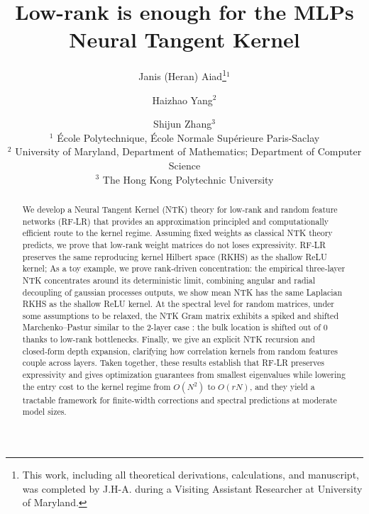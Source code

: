\documentclass{article}
\title{Low-rank is enough for the MLPs Neural Tangent Kernel}
\author{
  Janis (Heran) Aiad\thanks{This work, including all theoretical derivations, calculations, and manuscript, was completed by J.H-A. during a Visiting Assistant Researcher at University of Maryland.}$^{1}$ \and Haizhao Yang$^{2}$ \and Shijun Zhang$^{3}$ \\
  $^{1}$ École Polytechnique, École Normale Supérieure Paris-Saclay  \\
  $^{2}$ University of Maryland, Department of Mathematics; Department of Computer Science \\
  $^{3}$ The Hong Kong Polytechnic University
}
\theoremstyle{definition}
\theoremstyle{plain}
\theoremstyle{remark}
\begin{document}
\maketitle

\begin{abstract}
We develop a Neural Tangent Kernel (NTK) theory for low-rank and random feature networks (RF‑LR) that provides an approximation principled and computationally 
efficient route to the kernel regime. Assuming fixed weights as classical NTK theory predicts, we prove that low-rank weight matrices
do not loses expressivity. RF‑LR preserves the same reproducing kernel Hilbert space (RKHS) as the shallow ReLU kernel; 
As a toy example, we prove rank‑driven concentration: the empirical three‑layer NTK concentrates around its 
deterministic limit, combining angular and radial decoupling of gaussian processes outputs, we show mean NTK
has the same Laplacian RKHS as the shallow ReLU kernel. At the spectral level for random matrices, under some assumptions to be relaxed, the NTK Gram matrix exhibits a 
spiked and shifted Marchenko–Pastur similar to the 2-layer case : the bulk location is shifted out of 0 thanks to low-rank bottlenecks.
Finally, we give an explicit NTK recursion and closed‑form depth expansion, clarifying how correlation kernels from random features couple across layers.
Taken together, these results establish that RF‑LR preserves expressivity and gives optimization guarantees from smallest eigenvalues
while lowering the entry cost to the kernel regime from \(O(N^2)\) to \(O(rN)\), 
and they yield a tractable framework for finite‑width corrections and spectral predictions at moderate model sizes.
\end{abstract}


\tableofcontents
\vspace{2em}

\newpage





\newpage





\newpage

\end{document}

